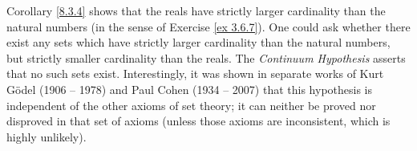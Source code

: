 \setcounter{theorem}{5}
\begin{remark}\label{8.3.6}
    Corollary \ref{8.3.4} shows that the reals have strictly larger cardinality than the natural numbers (in the sense of Exercise \ref{ex 3.6.7}).
    One could ask whether there exist any sets which have strictly larger cardinality than the natural numbers, but strictly smaller cardinality than the reals.
    The \emph{Continuum Hypothesis} asserts that no such sets exist.
    Interestingly, it was shown in separate works of Kurt Gödel (1906 -- 1978) and Paul Cohen (1934 -- 2007) that this hypothesis is independent of the other axioms of set theory;
    it can neither be proved nor disproved in that set of axioms
    (unless those axioms are inconsistent, which is highly unlikely).
\end{remark}